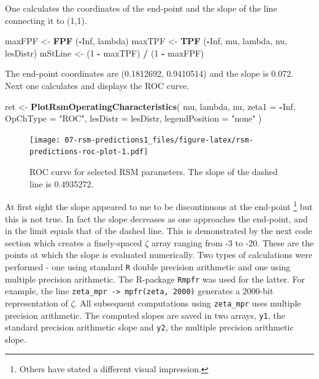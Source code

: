 \documentclass[
]{book}
\newenvironment{Shaded}{\begin{snugshade}}{\end{snugshade}}
\newcommand{\DataTypeTok}[1]{\textcolor[rgb]{0.13,0.29,0.53}{#1}}
\newcommand{\DecValTok}[1]{\textcolor[rgb]{0.00,0.00,0.81}{#1}}
\newcommand{\KeywordTok}[1]{\textcolor[rgb]{0.13,0.29,0.53}{\textbf{#1}}}
\newcommand{\NormalTok}[1]{#1}
\newcommand{\OperatorTok}[1]{\textcolor[rgb]{0.81,0.36,0.00}{\textbf{#1}}}
\newcommand{\OtherTok}[1]{\textcolor[rgb]{0.56,0.35,0.01}{#1}}
\newcommand{\StringTok}[1]{\textcolor[rgb]{0.31,0.60,0.02}{#1}}
\begin{document}
One calculates the coordinates of the end-point and the slope of the line connecting it to (1,1).

\begin{Shaded}
\begin{Highlighting}[]
\NormalTok{maxFPF <-}\StringTok{ }\KeywordTok{FPF}\NormalTok{ (}\OperatorTok{-}\OtherTok{Inf}\NormalTok{, lambda)}
\NormalTok{maxTPF <-}\StringTok{ }\KeywordTok{TPF}\NormalTok{ (}\OperatorTok{-}\OtherTok{Inf}\NormalTok{, mu, lambda, nu, lesDistr)}
\NormalTok{mStLine <-}\StringTok{ }\NormalTok{(}\DecValTok{1} \OperatorTok{-}\StringTok{ }\NormalTok{maxTPF) }\OperatorTok{/}\StringTok{ }\NormalTok{(}\DecValTok{1} \OperatorTok{-}\StringTok{ }\NormalTok{maxFPF)}
\end{Highlighting}
\end{Shaded}

The end-point coordinates are (0.1812692, 0.9410514) and the slope is 0.072. Next one calculates and displays the ROC curve.

\begin{Shaded}
\begin{Highlighting}[]
\NormalTok{ret <-}\StringTok{ }\KeywordTok{PlotRsmOperatingCharacteristics}\NormalTok{(}
\NormalTok{  mu,}
\NormalTok{  lambda,}
\NormalTok{  nu,}
  \DataTypeTok{zeta1 =} \OperatorTok{-}\OtherTok{Inf}\NormalTok{, }
  \DataTypeTok{OpChType =} \StringTok{"ROC"}\NormalTok{,}
  \DataTypeTok{lesDistr =}\NormalTok{ lesDistr,}
  \DataTypeTok{legendPosition =} \StringTok{"none"}
\NormalTok{)}
\end{Highlighting}
\end{Shaded}

\begin{figure}
\centering
\texttt{[image: 07-rsm-predictions1\_files/figure-latex/rsm-predictions-roc-plot-1.pdf]}
\caption{\label{fig:rsm-predictions-roc-plot}ROC curve for selected RSM parameters. The slope of the dashed line is 0.4935272.}
\end{figure}

At first sight the slope appeared to me to be discontinuous at the end-point \footnote{Others have stated a different visual impression.} but this is not true. In fact the slope decreases as one approaches the end-point, and in the limit equals that of the dashed line. This is demonstrated by the next code section which creates a finely-spaced \(\zeta\) array ranging from -3 to -20. These are the points at which the slope is evaluated numerically. Two types of calculations were performed - one using standard \texttt{R} double precision arithmetic and one using multiple precision arithmetic. The R-package \texttt{Rmpfr} was used for the latter. For example, the line \texttt{zeta\_mpr\ -\textgreater{}\ mpfr(zeta,\ 2000)} generates a 2000-bit representation of \(\zeta\). All subsequent computations using \texttt{zeta\_mpr} uses multiple precision arithmetic. The computed slopes are saved in two arrays, \texttt{y1}, the standard precision arithmetic slope and \texttt{y2}, the multiple precision arithmetic slope.
\end{document}
